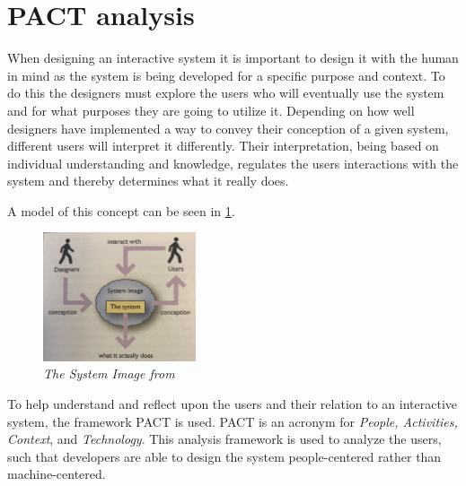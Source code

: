 
\section{PACT analysis}\label{sec:PACT}
When designing an interactive system it is important to design it with the human in mind as the system is being developed for a specific purpose and context.
To do this the designers must explore the users who will eventually use the system and for what purposes they are going to utilize it.
Depending on how well designers have implemented a way to convey their conception of a given system, different users will interpret it differently.
Their interpretation, being based on individual understanding and knowledge, regulates the users interactions with the system and thereby determines what it really does.
\citep{Benyon}

A model of this concept can be seen in \cref{fig:PACT-SystemImage}.

\begin{figure}[H]
	\centering
	\includegraphics[width=0.4\textwidth]{billeder/SystemImage-Benyon.png}
	\caption{\textit{The System Image from \citep[p.~31]{Benyon}}}
	\label{fig:PACT-SystemImage}
\end{figure}

To help understand and reflect upon the users and their relation to an interactive system, the framework PACT is used.
PACT is an acronym for \textit{People, Activities, Context}, and \textit{Technology}.
This analysis framework is used to analyze the users, such that developers are able to design the system people-centered rather than machine-centered.
\citep{Benyon}

